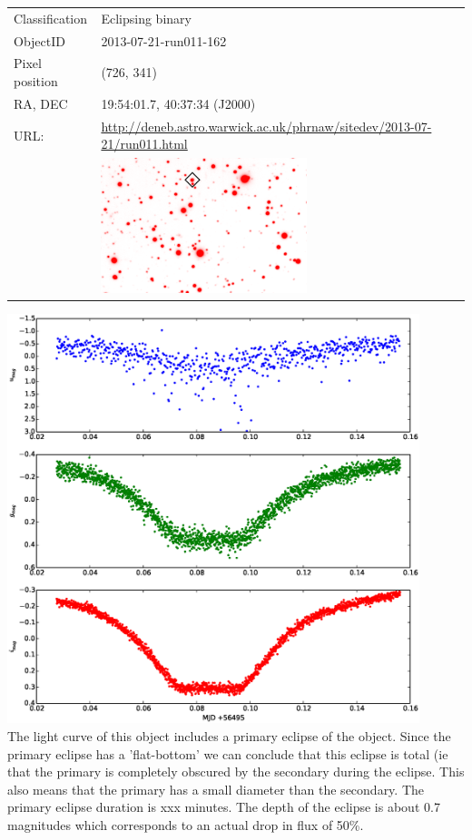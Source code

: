   \newpage
  \begin{tabular}{l l}
  Classification & Eclipsing binary \\
  ObjectID & 2013-07-21-run011-162 \\
  Pixel position & (726, 341) \\
  RA, DEC & 19:54:01.7, 40:37:34 (J2000) \\
  URL: & \small \url{http://deneb.astro.warwick.ac.uk/phrnaw/sitedev/2013-07-21/run011.html} \\
       & \includegraphics[width=60mm]{images/2013-07-21-run011-162.png} \\
  \end{tabular}
  \includegraphics[width=120mm]{images/2013-07-21-run011-162_lightcurve.eps} \\
  The light curve of this object includes a primary eclipse of the object. Since the primary eclipse has a 'flat-bottom' we can conclude that this eclipse is total (ie that the primary is completely obscured by the secondary during the eclipse. This also means that the primary has a small diameter than the secondary. The primary eclipse duration is xxx minutes. The depth of the eclipse is about 0.7 magnitudes which corresponds to an actual drop in flux of 50\%. 

